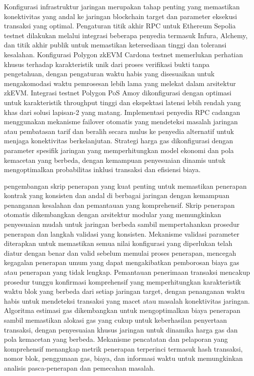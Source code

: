 Konfigurasi infrastruktur jaringan merupakan tahap penting yang memastikan
konektivitas yang andal ke jaringan blockchain target dan parameter eksekusi
transaksi yang optimal. Pengaturan titik akhir RPC untuk Ethereum Sepolia
testnet dilakukan melalui integrasi beberapa penyedia termasuk Infura, Alchemy,
dan titik akhir publik untuk memastikan ketersediaan tinggi dan toleransi
kesalahan. Konfigurasi Polygon zkEVM Cardona testnet memerlukan perhatian
khusus terhadap karakteristik unik dari proses verifikasi bukti tanpa
pengetahuan, dengan pengaturan waktu habis yang disesuaikan untuk mengakomodasi
waktu pemrosesan lebih lama yang melekat dalam arsitektur zkEVM. Integrasi
testnet Polygon PoS Amoy dikonfigurasi dengan optimasi untuk karakteristik
throughput tinggi dan ekspektasi latensi lebih rendah yang khas dari solusi
lapisan-2 yang matang. Implementasi penyedia RPC cadangan menggunakan mekanisme
failover otomatis yang mendeteksi masalah jaringan atau pembatasan tarif dan
beralih secara mulus ke penyedia alternatif untuk menjaga konektivitas
berkelanjutan. Strategi harga gas dikonfigurasi dengan parameter spesifik
jaringan yang memperhitungkan model ekonomi dan pola kemacetan yang berbeda,
dengan kemampuan penyesuaian dinamis untuk mengoptimalkan probabilitas inklusi
transaksi dan efisiensi biaya.

pengembangan skrip penerapan yang kuat penting untuk memastikan penerapan
kontrak yang konsisten dan andal di berbagai jaringan dengan kemampuan
penanganan kesalahan dan pemantauan yang komprehensif. Skrip penerapan otomatis
dikembangkan dengan arsitektur modular yang memungkinkan penyesuaian mudah
untuk jaringan berbeda sambil mempertahankan prosedur penerapan dan langkah
validasi yang konsisten. Mekanisme validasi parameter diterapkan untuk
memastikan semua nilai konfigurasi yang diperlukan telah diatur dengan benar
dan valid sebelum memulai proses penerapan, mencegah kegagalan penerapan umum
yang dapat mengakibatkan pemborosan biaya gas atau penerapan yang tidak
lengkap. Pemantauan penerimaan transaksi mencakup prosedur tunggu konfirmasi
komprehensif yang memperhitungkan karakteristik waktu blok yang berbeda dari
setiap jaringan target, dengan penanganan waktu habis untuk mendeteksi
transaksi yang macet atau masalah konektivitas jaringan. Algoritma estimasi gas
dikembangkan untuk mengoptimalkan biaya penerapan sambil memastikan alokasi gas
yang cukup untuk keberhasilan penyertaan transaksi, dengan penyesuaian khusus
jaringan untuk dinamika harga gas dan pola kemacetan yang berbeda. Mekanisme
pencatatan dan pelaporan yang komprehensif menangkap metrik penerapan
terperinci termasuk hash transaksi, nomor blok, penggunaan gas, biaya, dan
informasi waktu untuk memungkinkan analisis pasca-penerapan dan pemecahan
masalah.

